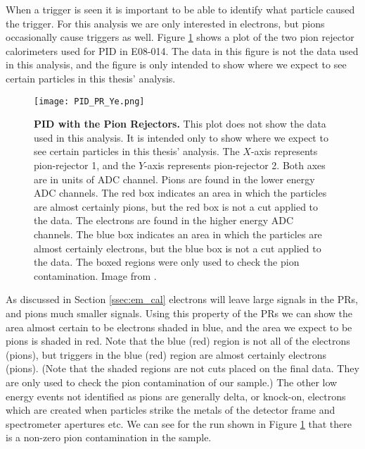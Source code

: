 When a trigger is seen it is important to be able to identify what particle caused the trigger. For this analysis we are only interested in electrons, but pions occasionally cause triggers as well. Figure \ref{fig:pid_pr_ye} shows a plot of the two pion rejector calorimeters used for PID in E08-014. The data in this figure is not the data used in this analysis, and the figure is only intended to show where we expect to see certain particles in this thesis' analysis. 

\begin{figure}[!ht]
\begin{center}
\texttt{[image: PID\_PR\_Ye.png]}
\end{center}
\caption[PID with the Pion Rejectors]{
{\bf{PID with the Pion Rejectors.}} This plot does not show the data used in this analysis. It is intended only to show where we expect to see certain particles in this thesis' analysis. The $X$-axis represents pion-rejector 1, and the $Y$-axis represents pion-rejector 2. Both axes are in units of ADC channel. Pions are found in the lower energy ADC channels. The red box indicates an area in which the particles are almost certainly pions, but the red box is not a cut applied to the data. The electrons are found in the higher energy ADC channels. The blue box indicates an area in which the particles are almost certainly electrons, but the blue box is not a cut applied to the data. The boxed regions were only used to check the pion contamination. Image from \cite{Thesis:Ye}.}
\label{fig:pid_pr_ye}
\end{figure}

As discussed in Section \ref{ssec:em_cal} electrons will leave large signals in the PRs, and pions much smaller signals. Using this property of the PRs we can show the area almost certain to be electrons shaded in blue, and the area we expect to be pions is shaded in red. Note that the blue (red) region is not all of the electrons (pions), but triggers in the blue (red) region are almost certainly electrons (pions). (Note that the shaded regions are not cuts placed on the final data. They are only used to check the pion contamination of our sample.) The other low energy events not identified as pions are generally delta, or knock-on, electrons which are created when particles strike the metals of the detector frame and spectrometer apertures etc. We can see for the run shown in Figure \ref{fig:pid_pr_ye} that there is a non-zero pion contamination in the sample. 

